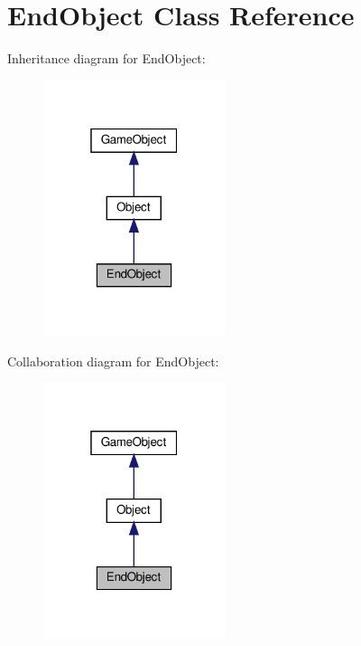 \hypertarget{classEndObject}{}\section{End\+Object Class Reference}
\label{classEndObject}


Inheritance diagram for End\+Object\+:
\nopagebreak
\begin{figure}[H]
\begin{center}
\leavevmode
\includegraphics[width=151pt]{classEndObject__inherit__graph}
\end{center}
\end{figure}


Collaboration diagram for End\+Object\+:
\nopagebreak
\begin{figure}[H]
\begin{center}
\leavevmode
\includegraphics[width=151pt]{classEndObject__coll__graph}
\end{center}
\end{figure}
